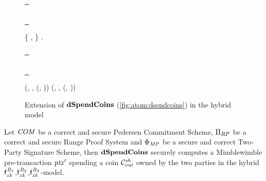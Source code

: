 \begin{figure}
\begin{center}
{\begin{varwidth}{\textwidth}
{            \< \sendmessageleft*{\funStarAlt{\varPreTx}} \< \\
            \color{blue} \pcif {}  \\
            \color{blue} \t \pcreturn \cnstFalsum \\
            \color{blue} \pcif {}  \\
            \color{blue} \t \pcreturn \cnstFalsum \\
            \{ \varPubKey, \varRand \} \opFunResult \funStarAlt{\varPreTx}.\varSigContext \\
            \color{blue} \pcif {}  \\
            \color{blue} \t \pcreturn \cnstFalsum \\
            \color{blue} \pcif {}  \\
            \color{blue} \t \pcreturn \cnstFalsum \\
            \pcreturn (\funStarAlt{\varPreTx}, \funStar{\varSpendableCoinAlice}, (\varSecKeyAlice, \varNonceAlice)) \< \< \pcreturn (\funStarAlt{\varPreTx}, \funStar{\varSpendableCoinCarol}, (\varSecKeyCarol, \varNonceCarol))
            }
        \end{varwidth}
        }
    \end{center}
    \caption{Extension of $\mathbf{dSpendCoins}$ (\cref{fig:atom:dsendcoins}) in the hybrid model} \label{fig:atom:hybrid-dsend}
\end{figure}

\begin{theorem}
    \label{teo:atom:sec-dspend}
    Let $\mathit{COM}$ be a correct and secure Pedersen Commitment Scheme, $\Pi_{RP}$ be a correct and secure Range Proof System and $\Phi_{\mathit{MP}}$ be a secure and correct Two-Party Signature Scheme, then $\mathbf{dSpendCoins}$ securely computes a Mimblewimble pre-transaction ${\mathit{ptx}}'$ spending a coin $\mathcal{C}_{\mathit{out}}^{\mathit{sh}}$ owned by the two parties in the hybrid $\mathsf{f}^{\mathit{R}_1}_{zk}$,$\mathsf{f}^{\mathit{R}_2}_{zk}$,$\mathsf{f}^{\mathit{R}_3}_{zk}$-model.
\end{theorem}


